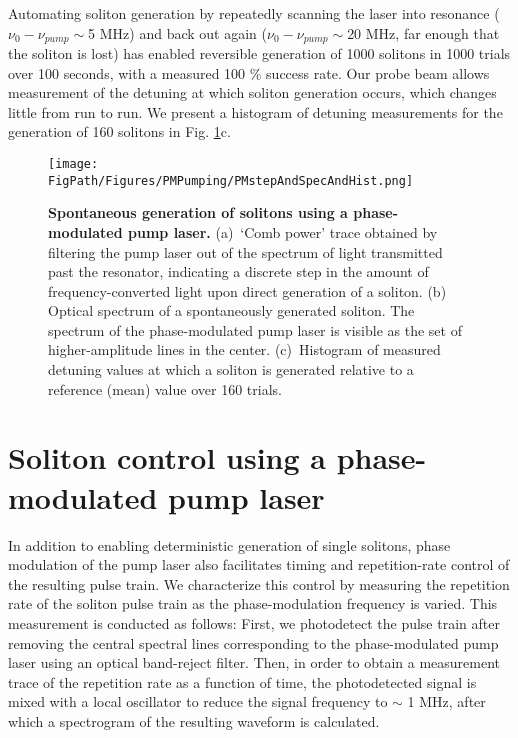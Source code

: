 Automating soliton generation by repeatedly scanning the laser into resonance ($\nu_0-\nu_{pump}\sim$5 MHz) and back out again ($\nu_0-\nu_{pump}\sim$20 MHz, far enough that the soliton is lost) has enabled reversible generation of 1000 solitons in 1000 trials over 100 seconds, with a measured 100 $\%$ success rate. Our probe beam allows measurement of the detuning at which soliton generation occurs, which changes little from run to run. We present a histogram of detuning measurements for the generation of 160 solitons in Fig. \ref{fig:PMgen}c. 

\begin{figure}[htpb]
	\begin{center}
		\texttt{[image: \\FigPath/Figures/PMPumping/PMstepAndSpecAndHist.png]}
	\end{center}
	\caption[Spontaneous generation of solitons using a phase-modulated pump laser]{\textbf{Spontaneous generation of solitons using a phase-modulated pump laser.} (a)~`Comb power' trace obtained by filtering the pump laser out of the spectrum of light transmitted past the resonator, indicating a discrete step in the amount of frequency-converted light upon direct generation of a soliton. (b) Optical spectrum of a spontaneously generated soliton. The spectrum of the phase-modulated pump laser is visible as the set of higher-amplitude lines in the center. (c)~Histogram of measured detuning values at which a soliton is generated relative to a reference (mean) value over 160 trials.}
	\label{fig:PMgen}
\end{figure} 

\section{Soliton control using a phase-modulated pump laser}

In addition to enabling deterministic generation of single solitons, phase modulation of the pump laser also facilitates timing and repetition-rate control of the resulting pulse train. We characterize this control by measuring the repetition rate of the soliton pulse train as the phase-modulation frequency is varied. This measurement is conducted as follows: First, we photodetect the pulse train after removing the central spectral lines corresponding to the phase-modulated pump laser using an optical band-reject filter. Then, in order to obtain a measurement trace of the repetition rate as a function of time, the photodetected signal is mixed with a local oscillator to reduce the signal frequency to $\sim$ 1 MHz, after which a spectrogram of the resulting waveform is calculated.



